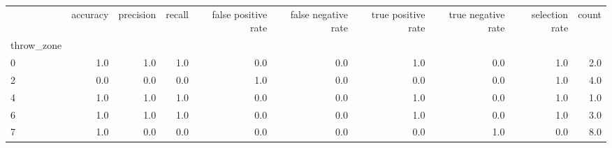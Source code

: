 \begin{tabular}{lrrrrrrrrr}
\toprule
{} &  accuracy &  precision &  recall &  false positive rate &  false negative rate &  true positive rate &  true negative rate &  selection rate &  count \\
throw\_zone &           &            &         &                      &                      &                     &                     &                 &        \\
\midrule
0          &       1.0 &        1.0 &     1.0 &                  0.0 &                  0.0 &                 1.0 &                 0.0 &             1.0 &    2.0 \\
2          &       0.0 &        0.0 &     0.0 &                  1.0 &                  0.0 &                 0.0 &                 0.0 &             1.0 &    4.0 \\
4          &       1.0 &        1.0 &     1.0 &                  0.0 &                  0.0 &                 1.0 &                 0.0 &             1.0 &    1.0 \\
6          &       1.0 &        1.0 &     1.0 &                  0.0 &                  0.0 &                 1.0 &                 0.0 &             1.0 &    3.0 \\
7          &       1.0 &        0.0 &     0.0 &                  0.0 &                  0.0 &                 0.0 &                 1.0 &             0.0 &    8.0 \\
\bottomrule
\end{tabular}
